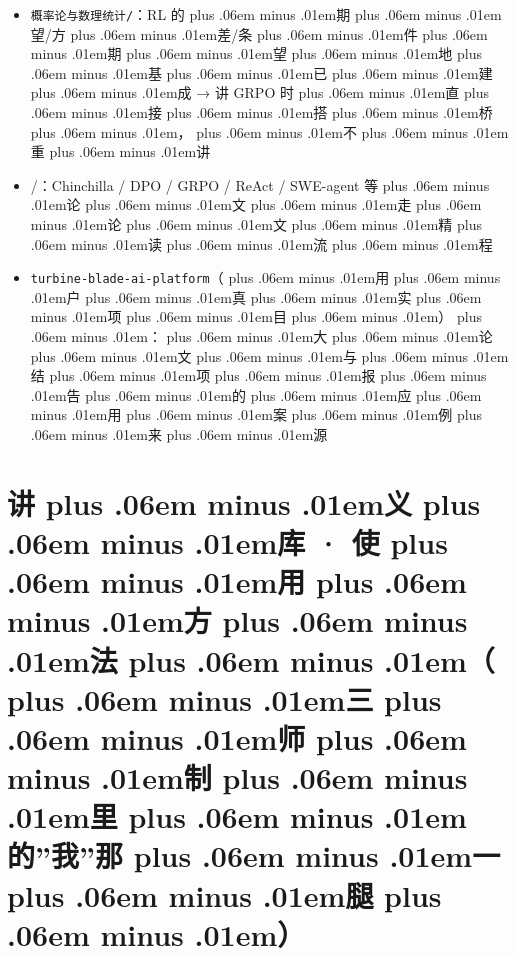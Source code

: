 \documentclass[
]{article}
\newcommand{\passthrough}[1]{#1}
\providecommand{\tightlist}{%
  \setlength{\itemsep}{0pt}\setlength{\parskip}{0pt}}
\def\zh#1{{\zhfont #1}}
\def\sym#1{{\symfont #1}}
\def\codezh#1{{\zhmonofont #1}}
\def\zhglue{\hskip0pt plus .06em minus .01em}
\begin{document}
\begin{itemize}
\tightlist
\item
  \passthrough{\lstinline!概率论与数理统计/!}\zh{：}RL \zh{的\zhglue 期\zhglue 望}/\zh{方\zhglue 差}/\zh{条\zhglue 件\zhglue 期\zhglue 望\zhglue 地\zhglue 基\zhglue 已\zhglue 建\zhglue 成} \sym{→} \zh{讲} GRPO \zh{时\zhglue 直\zhglue 接\zhglue 搭\zhglue 桥\zhglue ，\zhglue 不\zhglue 重\zhglue 讲}
\item
  \passthrough{\codezh{{\zh{论}}{\zh{文}}{\zh{精}}{\zh{读}}/}}\zh{：}Chinchilla / DPO / GRPO / ReAct / SWE-agent \zh{等\zhglue 论\zhglue 文\zhglue 走\zhglue 论\zhglue 文\zhglue 精\zhglue 读\zhglue 流\zhglue 程}
\item
  \passthrough{\lstinline!turbine-blade-ai-platform!}\zh{（\zhglue 用\zhglue 户\zhglue 真\zhglue 实\zhglue 项\zhglue 目\zhglue ）\zhglue ：\zhglue 大\zhglue 论\zhglue 文\zhglue 与\zhglue 结\zhglue 项\zhglue 报\zhglue 告\zhglue 的\zhglue 应\zhglue 用\zhglue 案\zhglue 例\zhglue 来\zhglue 源}
\end{itemize}

\newpage

\section{\zh{讲\zhglue 义\zhglue 库} \sym{·} \zh{使\zhglue 用\zhglue 方\zhglue 法\zhglue （\zhglue 三\zhglue 师\zhglue 制\zhglue 里\zhglue 的}''\zh{我}''\zh{那\zhglue 一\zhglue 腿\zhglue ）}}\label{ux8bb2ux4e49ux5e93-ux4f7fux7528ux65b9ux6cd5ux4e09ux5e08ux5236ux91ccux7684ux6211ux90a3ux4e00ux817f}
\end{document}
